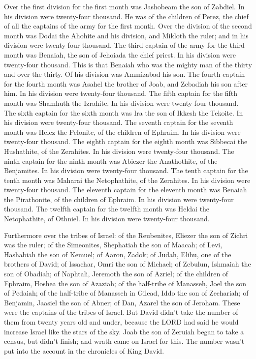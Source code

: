 \myverse{}Over the first division for the first month was Jashobeam the
son of Zabdiel. In his division were twenty-four thousand.
\myverse{}He was of the children of Perez, the chief of all the captains of the army
for the first month.
\myverse{}Over the division of the second month was Dodai the Ahohite and his division,
and Mikloth the ruler; and in his division were twenty-four thousand.
\myverse{}The third captain of the army for the third month was Benaiah, the son of Jehoiada
the chief priest. In his division were twenty-four thousand.
\myverse{}This is that Benaiah who was the mighty man of the thirty and over the thirty.
Of his division was Ammizabad his son.
\myverse{}The fourth captain for the fourth month was Asahel the brother of Joab, and
Zebadiah his son after him. In his division were twenty-four thousand.
\myverse{}The fifth captain for the fifth month was Shamhuth the Izrahite. In his division
were twenty-four thousand.
\myverse{}The sixth captain for the sixth month was Ira the son of Ikkesh the Tekoite.
In his division were twenty-four thousand.
\myverse{}The seventh captain for the seventh month was Helez the Pelonite, of the
children of Ephraim. In his division were twenty-four thousand.
\myverse{}The eighth captain for the eighth month was Sibbecai the Hushathite, of the
Zerahites. In his division were twenty-four thousand.
\myverse{}The ninth captain for the ninth month was Abiezer the Anathothite, of the
Benjamites. In his division were twenty-four thousand.
\myverse{}The tenth captain for the tenth month was Maharai the Netophathite, of the
Zerahites. In his division were twenty-four thousand.
\myverse{}The eleventh captain for the eleventh month was Benaiah the Pirathonite,
of the children of Ephraim. In his division were twenty-four thousand.
\myverse{}The twelfth captain for the twelfth month was Heldai the Netophathite, of
Othniel. In his division were twenty-four thousand.

\myverse{}Furthermore over the tribes of Israel: of the Reubenites, Eliezer
the son of Zichri was the ruler; of the Simeonites, Shephatiah the son of Maacah;
\myverse{}of Levi, Hashabiah the son of Kemuel; of Aaron, Zadok;
\myverse{}of Judah, Elihu, one of the brothers of David; of Issachar, Omri the son
of Michael;
\myverse{}of Zebulun, Ishmaiah the son of Obadiah; of Naphtali, Jeremoth the son of
Azriel;
\myverse{}of the children of Ephraim, Hoshea the son of Azaziah; of the half-tribe
of Manasseh, Joel the son of Pedaiah;
\myverse{}of the half-tribe of Manasseh in Gilead, Iddo the son of Zechariah; of Benjamin,
Jaasiel the son of Abner;
\myverse{}of Dan, Azarel the son of Jeroham. These were the captains of the tribes
of Israel.
\myverse{}But David didn’t take the number of them from twenty years old and under,
because the LORD had said he would increase Israel like the stars of the sky.
\myverse{}Joab the son of Zeruiah began to take a census, but didn’t finish; and wrath
came on Israel for this. The number wasn’t put into the account in the chronicles of King David.

